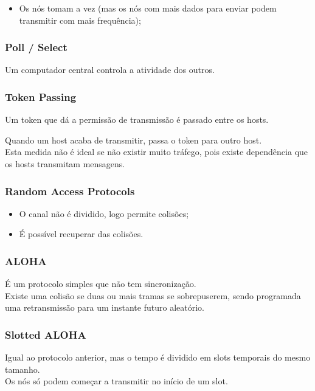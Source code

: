 \documentclass[12pt]{article}
\begin{document}
\begin{itemize}
    \item Os nós tomam a vez (mas os nós com mais dados para enviar podem transmitir com mais frequência);
\end{itemize}

\subsubsection*{Poll / Select}

Um computador central controla a atividade dos outros.

\subsubsection*{Token Passing}

Um token que dá a permissão de transmissão é passado entre os hosts.

Quando um host acaba de transmitir, passa o token para outro host.\\

Esta medida não é ideal se não existir muito tráfego, pois existe dependência que os hosts transmitam mensagens.

\subsubsection{Random Access Protocols}

\begin{itemize}
    \item O canal não é dividido, logo permite colisões;
    \item É possível recuperar das colisões.
\end{itemize}

\subsubsection*{ALOHA}

É um protocolo simples que não tem sincronização. \\
Existe uma colisão se duas ou mais tramas se sobrepuserem, sendo programada uma retransmissão para um instante futuro aleatório.

\subsubsection*{Slotted ALOHA}

Igual ao protocolo anterior, mas o tempo é dividido em slots temporais do mesmo tamanho. \\
Os nós só podem começar a transmitir no início de um slot.
\end{document}
